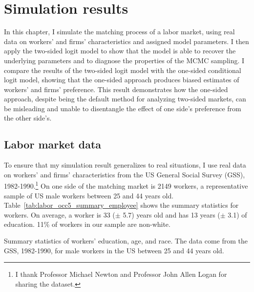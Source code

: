 \chapter{Simulation results}
\label{chap:simulation}

In this chapter, I simulate the matching process of a labor market, using real
data on
workers' and firms' characteristics and assigned model parameters. I then apply
the two-sided logit model to show that the model is able to recover the
underlying parameters and to diagnose the properties of the MCMC sampling. I
compare the results of the two-sided logit model with the one-sided conditional
logit model, showing that the one-sided approach produces biased estimates of
workers' and firms' preference. This result demonstrates how the one-sided
approach, despite being the default method for analyzing two-sided markets, can
be misleading and unable to disentangle the effect of one side's preference from
the other side's.

\section{Labor market data}

To ensure that my simulation result generalizes to real situations, I use real
data on workers' and firms' characteristics from the US General Social Survey
(GSS), 1982-1990.\footnote{I thank Professor Michael Newton and Professor John
  Allen Logan for sharing the dataset.} On one side of the matching market is 2149 workers, a representative sample
of US male workers between 25 and 44 years old.
Table~\ref{tab:labor_occ5_summary_employee} shows the summary statistics for
workers. On average, a worker is 33 ($\pm$ 5.7)
years old and has 13 years ($\pm$ 3.1) of education. 11\% of workers in our sample are
non-white.

\begin{table}[!ht]
  \centering
  \caption[Summary statistics of US male workers between 25 and 44 years old, 1982-1990.]{Summary statistics of workers' education, age, and race. The data
    come from the GSS, 1982-1990, for male workers in the US between 25 and 44
    years old.}
  \label{tab:labor_occ5_summary_employee}

\end{table}

